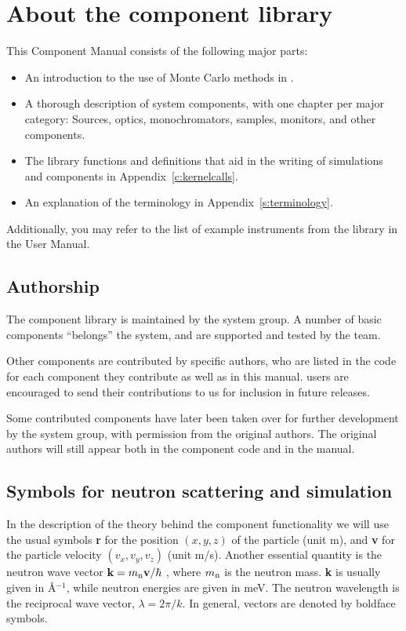 
\chapter{About the component library}
This \MCS Component Manual consists of the following major parts:\label{c:components}
\begin{itemize}
\item An introduction to the use of Monte Carlo methods in \MCS .
\item A thorough description of system components,
with one chapter per major category: Sources, optics,
monochromators, samples, monitors, and other components.
\item The \MCS library functions and definitions
  that aid in the writing of simulations and components in
  Appendix~\ref{c:kernelcalls}.
\item An explanation of the \MCS terminology in Appendix~\ref{s:terminology}.
\end{itemize}
Additionally, you may refer to the list of example instruments
from the library in the \MCS User Manual.

\section{Authorship}
The component library is
maintained by the \MCS system group. A number of basic components
``belongs'' the \MCS system, and are supported and tested by the \MCS
team.

Other components are contributed
by specific authors, who are listed in the code for each component
they contribute as well as in this manual.
\MCS users are encouraged to send their
contributions to us for inclusion in future releases.

Some contributed components have later been taken over
for further development by the \MCS system
group, with permission from the original authors.
The original authors will still appear both in the component code and in the
\MCS manual.

\section{Symbols for neutron scattering and simulation}
In the description of the theory behind the component functionality
we will use the usual symbols {\bf r} for the position
$(x,y,z)$ of the particle (unit m), and {\bf v} for
the particle velocity $(v_x, v_y, v_z)$ (unit m/s).
Another essential quantity is the neutron wave vector
${\bf k} = m_{\rm n} {\bf v}/\hbar$ , where
$m_{\rm n}$ is the neutron mass. {\bf k} is usually given in
\AA$^{-1}$, while neutron energies are given in meV.
The neutron wavelength is the reciprocal wave vector,
$\lambda=2 \pi / k$.
In general, vectors are denoted by boldface symbols.

